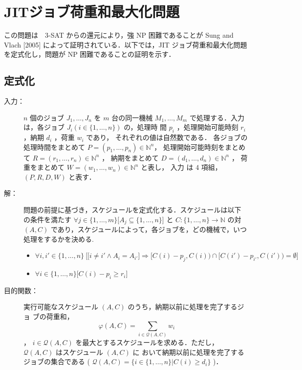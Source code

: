 \documentclass[12pt]{optlab-bachelor}
\begin{document}
\section{JITジョブ荷重和最大化問題}\label{3_s_1}
この問題は　\textsc{3-SAT} からの還元により，強 NP 困難であることが Sung and Vlach [2005] \cite{SJIT} によって証明されている．以下では，JIT ジョブ荷重和最大化問題を定式化し，問題が NP 困難であることの証明を示す．
\subsection{定式化}
\begin{description}
  \item[入力：] $n$ 個のジョブ $J_1,\ldots,J_n$ を $m$ 台の同一機械 $M_1,\ldots,M_m$
  で処理する．入力は，各ジョブ $J_i ( i \in \{1,\ldots,n\} )$ の，処理時
  間 $p_i$ ，処理開始可能時刻 $r_i$ ，納期 $d_i$ ，荷重 $w_i$ であり，
  それぞれの値は自然数である．
  各ジョブの処理時間をまとめて $P = (p_1,\ldots,p_n) \in \mathbb{N}^n$，
  処理開始可能時刻をまとめて $R = (r_1,\ldots,r_n) \in \mathbb{N}^n$ ，
  納期をまとめて $D = (d_1,\ldots,d_n) \in \mathbb{N}^n$ ，
  荷重をまとめて $W = (w_1,\ldots,w_n) \in \mathbb{N}^n$ と表し，
  入力 は 4 項組，$(P,R,D,W)$ と表す．
  \item[解：] 問題の前提に基づき，スケジュールを定式化する．スケジュールは以下
  の条件を満たす $\forall j \in \{1,\ldots,m\}\big[A_j \subseteq
  \{1,\ldots,n\}\big]$ と $C : \{1,\ldots,n\} \to \mathbb{N}$ の対 $(A,
  C)$ であり，スケジュールによって，各ジョブを，どの機械で，いつ処理をするかを決める.
  \begin{itemize}
    \item {\small $\forall i, i' \in \{1,\ldots,n\}\ \Big[ \big[i \neq i' \land A_i = A_{i'}\big] \Rightarrow [C(i) - p_j, C(i)) \cap [C(i') - p_{i'}, C(i')) = \emptyset \Big]$}
    \item  $\forall i \in \{1,\ldots,n\}\big[C(i) - p_i \ge r_i\big]$
  \end{itemize}
  \item[目的関数：] 実行可能なスケジュール $(A, C)$ のうち，納期以前に処理を完了するジョ
  ブの荷重和，
  $$\displaystyle \varphi(A,C) = \sum_{i \in \mathcal{Q}(A,C)}w_i$$，
  $i \in \mathcal{Q}(A,C)$ を最大とするスケジュールを求める．ただし，
  $\mathcal{Q}(A, C)$ はスケジュール $(A, C)$ に
  おいて納期以前に処理を完了するジョブの集合である (
  $\mathcal{Q}(A, C) = \{i \in \{1,\ldots, n\} | C(i) \ge d_i \}$ )．
\end{description}
\end{document}
